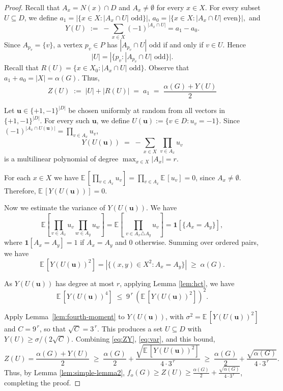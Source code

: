 \documentclass[11pt]{article}
\theoremstyle{definition}
\theoremstyle{remark}
\newcommand{\1}{\mathbf{1}}
\begin{document}
	\begin{proof}
		Recall that $A_x = N(x) \cap D$ and $A_x \neq \emptyset$ for every $x \in X$. For every subset $U\subseteq D$, we define
		$a_1=|\{x \in X : |A_x \cap U|\text{ odd}\}|$, $a_0=|\{x \in X : |A_x \cap U|\text{ even}\}|,$ and 
		\[
		Y(U) \;:=\; -\sum_{x \in X} (-1)^{|A_x \cap U|}=a_1-a_0.
		\]
		Since $A_{p_v} = \{v\}$, a vertex $p_v\in P$ has $|A_{p_v} \cap U|$ odd
		if and only if $v \in U$. Hence $$|U| = |\{p_v : |A_{p_v} \cap U|\text{ odd}\}|.$$
		Recall that $R(U) = \{x \in X_0 : |A_x \cap U|\text{ odd}\}$. Observe that $a_1+a_0=|X|=\alpha(G).$ Thus,
		\begin{equation}\label{eq:ZY}
			Z(U) \;:=\; |U| + |R(U)| \;=\;  a_1 \;=\; \frac{\alpha(G) + Y(U)}{2}
		\end{equation}
		
		
		Let $\mathbf{u}\in \{+1,-1\}^{|D|}$ be chosen uniformly at random from all vectors in $\{+1,-1\}^{|D|}$. For every such $\mathbf{u}$, we define $U(\mathbf{u}):=\{v\in D:u_v=-1\}$. Since $(-1)^{|A_x \cap U(\mathbf{u})|} = \prod_{v \in A_x} u_v$,
		\[
		Y(U(\mathbf{u})) \;=\; -\sum_{x \in X} \, \prod_{v \in A_x} u_v
		\]
		is a multilinear polynomial of degree $\max_{x \in X} |A_x| = r$.
		
		\smallskip
		For each $x \in X$ we have
		$\mathbb{E}\, [\prod_{v \in A_x} u_v] = \prod_{v \in A_x} \mathbb{E}\,[u_v] = 0$, since $A_x \neq \emptyset$. Therefore, $\mathbb{E}\,[Y(U(\mathbf{u}))] = 0$.
		
		\smallskip
		Now we estimate the variance of $Y(U(\mathbf{u}))$. We have
		\[
		\mathbb{E}\!\left[
		\prod_{v \in A_x} u_v \prod_{w \in A_y} u_w
		\right]
		= \mathbb{E} \left[\,\!\!\prod_{v \in A_x \triangle A_y}\!\! u_v\right]
		= \mathbf{1}[\{A_x = A_y\}],
		\]
		where $\mathbf{1}[A_x = A_y]=1$ if $A_x = A_y$ and 0 otherwise. Summing over ordered pairs, we have
		\begin{equation}\label{eq:var}
			\mathbb{E}\,[Y(U(\mathbf{u}))^2]
			= |\{(x,y) \in X^2 : A_x = A_y\}|
			\;\ge\; \alpha(G).
		\end{equation}
		
		\smallskip
		As $Y(U(\mathbf{u}))$ has degree at most $r$, applying Lemma \ref{lem:hct}, we have
		\[
		\mathbb{E}\,[Y(U(\mathbf{u}))^4] \;\le\; 9^{\,r} \,(\mathbb{E}\, [Y(U(\mathbf{u}))^2])^2.
		\]
		
		\smallskip
		Apply Lemma~\ref{lem:fourth-moment} to $Y(U(\mathbf{u}))$,  with $\sigma^2 = \mathbb{E}\,[Y(U(\mathbf{u}))^2]$ and $C = 9^{\,r}$, so that $\sqrt{C} = 3^{\,r}$.
		This produces a set $U \subseteq D$ with $Y(U) \ge \sigma / (2\sqrt{C})$. Combining \eqref{eq:ZY}, \eqref{eq:var}, and this bound,
		\[
		Z(U) = \frac{\alpha(G) + Y(U)}{2}
		\;\ge\; \frac{\alpha(G)}{2} + \frac{\sqrt{\mathbb{E}\,[Y(U(\mathbf{u}))^2]}}{4 \cdot 3^{\,r}}
		\;\ge\; \frac{\alpha(G)}{2} + \frac{\sqrt{\alpha(G)}}{4 \cdot 3^{\,r}}.
		\]
		 Thus, by Lemma \ref{lem:simple-lemma2}, $f_o(G)\geq Z(U)\geq \frac{\alpha(G)}{2} + \frac{\sqrt{\alpha(G)}}{4 \cdot 3^{\,r}}$, completing the proof. 
	\end{proof}
	
\end{document}
